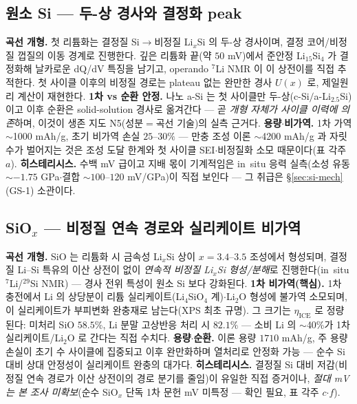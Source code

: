\subsection{원소 Si --- 두-상 경사와 결정화 peak}\label{ssec:si-elemental}
\textbf{곡선 개형.} 첫 리튬화는 결정질 Si$\to$비정질 Li$_x$Si 의 두-상 경사이며, 결정 코어/비정질 껍질의
이동 경계로 진행한다\cite{limthongkul2003,li_dahn2007,mcdowell_coreshell2013}. 깊은 리튬화 끝(약 $50$
mV)에서 준안정 Li$_{15}$Si$_4$ 가 결정화해 날카로운 dQ/dV 특징을 남기고\cite{obrovac_christensen2004},
operando $^7$Li NMR 이 이 상전이를 직접 추적한다\cite{ogata_nmr2014}. 첫 사이클 이후의 비정질 경로는
plateau 없는 완만한 경사 $U(x)$ 로, 제일원리 계산이 재현한다\cite{chevrier_dahn2009}.
\textbf{1차 vs 순환 안정.} 나노 a-Si 는 첫 사이클만 두-상(c-Si$/$a-Li$_{2.5}$Si)이고 이후 순환은
solid-solution 경사로 옮겨간다\cite{wang_asi2013} --- 곧 \emph{개형 자체가 사이클 이력에 의존}하며, 이것이
생존 지도 N5(성분$=$곡선 기술)의 실측 근거다. \textbf{용량$\cdot$비가역.} 1차 가역 $\sim$1000 mAh/g,
초기 비가역 손실 $25$--$30\%$\cite{limthongkul2003} --- 만충 조성 이론 $\sim$4200 mAh/g\cite{wen_huggins1981}
과 자릿수가 벌어지는 것은 조성 도달 한계와 첫 사이클 SEI$\cdot$비정질화 소모 때문이다(표 각주 $a$).
\textbf{히스테리시스.} 수백 mV 급이고 지배 몫이 기계적임은 in~situ 응력 실측(소성 유동 $\sim-1.75$
GPa$\cdot$결합 $\sim100$--$120$ mV/GPa)이 직접 보인다\cite{sethuraman_stressevo2010,sethuraman_stresspot2010}
--- 그 취급은 \S\ref{sec:si-mech}(GS-1) 소관이다.

\subsection{SiO$_x$ --- 비정질 연속 경로와 실리케이트 비가역}\label{ssec:si-siox}
\textbf{곡선 개형.} SiO 는 리튬화 시 금속성 Li$_x$Si 상이 $x{=}3.4$--$3.5$ 조성에서 형성되며, 결정질 Li--Si
특유의 이산 상전이 없이 \emph{연속적 비정질 Li$_x$Si 형성/분해}로 진행한다(in~situ $^7$Li/$^{29}$Si
NMR)\cite{kitada_sio2019} --- 경사 전위 특성이 원소 Si 보다 강화된다. \textbf{1차 비가역(핵심).} 1차
충전에서 Li 의 상당분이 리튬 실리케이트(Li$_4$SiO$_4$ 계)$\cdot$Li$_2$O 형성에 불가역 소모되며, 이
실리케이트가 부피변화 완충재로 남는다(XPS 최초 규명\cite{miyachi_sio2005}). 그 크기는 $\eta_\mathrm{ICE}$
로 정량된다: 미처리 SiO $58.5\%$, Li 분말 고상반응 처리 시 $82.1\%$\cite{yom_sio2016} --- 소비 Li 의
$\sim$40\%가 1차 실리케이트/Li$_2$O 로 간다는 직접 수치다. \textbf{용량$\cdot$순환.} 이론 용량 $1710$
mAh/g, 주 용량손실이 초기 수 사이클에 집중되고 이후 완만화하며 열처리로 안정화 가능\cite{zhang_sio2018}
--- 순수 Si 대비 상대 안정성이 실리케이트 완충의 대가다. \textbf{히스테리시스.} 결정질 Si 대비 저감(비정질
연속 경로가 이산 상전이의 경로 분기를 줄임)이 유일한 직접 증거\cite{kitada_sio2019}이나, \emph{절대 mV 는
본 조사 미확보}(순수 SiO$_x$ 단독 1차 문헌 mV 미특정 --- 확인 필요, 표 각주 $c$$\cdot$$f$).

